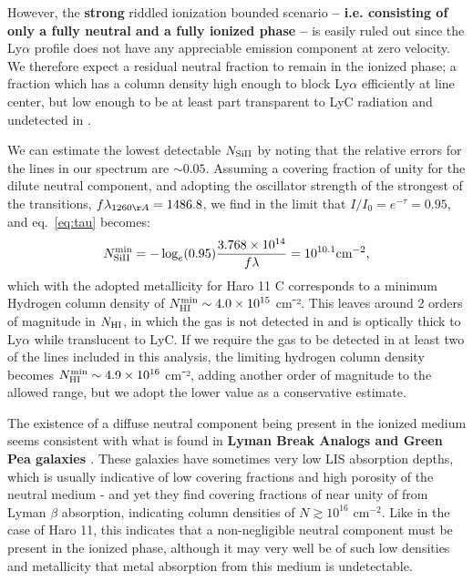 \documentclass[twocolumn, trackchanges]{aastex61}
\begin{document}
However, the \textbf{strong} riddled ionization bounded scenario 
\textbf{-- i.e. consisting of only a fully neutral and a fully ionized phase --} 
is easily
ruled out since the Ly$\alpha$ profile does not have any appreciable
emission component at zero velocity. We therefore expect a residual
neutral fraction to remain in the ionized phase; a fraction which has a
column density high enough to block Ly$\alpha$ efficiently at line
center, but low enough to be at least part transparent to LyC
radiation and undetected in .

We can estimate the lowest detectable $N_{\rm Si II}$ by noting that the
relative errors for the  lines in our spectrum are
$\sim 0.05$. Assuming a covering fraction of unity for the dilute
neutral component, and adopting the oscillator strength of the strongest
of the  transitions, $f\lambda_{1260 \AA} = 1486.8$, we find
in the limit that $I/I_0 = e^{-\tau} = 0.95$, and eq.~\ref{eq:tau}
becomes:
%
\begin{equation}
\label{eq:silim}
N_{\rm Si II}^{\rm min} = -\log_{e}(0.95) \frac{3.768 \times 10^{14}}{f\lambda} 
    = 10^{10.1} \text{cm}^{-2},
\end{equation}
%
 which with the adopted metallicity for Haro 11 C corresponds to a
minimum Hydrogen column density of
$N_{\rm HI}^{\rm min} \sim 4.0 \times 10^{15}$ cm⁻². This leaves around
2 orders of magnitude in $N_{\rm H I}$, in which the gas is not detected
in  and is optically thick to Ly$\alpha$ while translucent to
LyC. If we require the gas to be detected in at least two of
the lines included in this analysis, the limiting hydrogen column
density becomes $N_{\rm HI}^{\rm min} \sim 4.9 \times 10^{16}$ cm⁻²,
adding another order of magnitude to the allowed range, but we adopt the
lower value as a conservative estimate.

The existence of a diffuse neutral component being present in the
ionized medium seems consistent with what is found in \textbf{Lyman Break
Analogs and Green Pea galaxies \citep{Heckman2011, Henry2015}}. 
These galaxies have sometimes very low
LIS absorption depths, which is usually indicative of low covering
fractions and high porosity of the neutral medium - and yet they find
covering fractions of near unity of  from Lyman $\beta$
absorption, indicating column densities of $N \gtrsim 10^{16}$ cm$^{-2}$. Like in
the case of Haro 11, this indicates that a non-negligible neutral
component must be present in the ionized phase, although it may very
well be of such low densities and metallicity that metal absorption from
this medium is undetectable.
\end{document}

